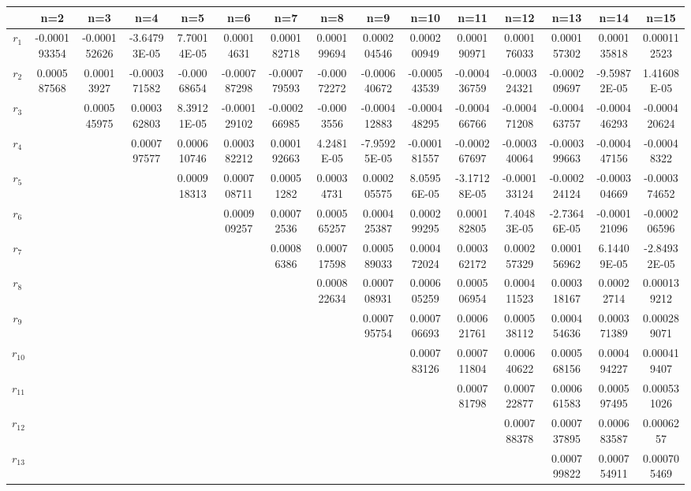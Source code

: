 \documentclass[a4paper]{article}
\begin{document}
\begin{CJK*}{GBK}{song}
\begin{center}
\begin{table*}[!htbp]
{\begin{threeparttable}[!htbp]
\begin{tabular}{ccccc ccccc ccccc}
 &n=2&n=3 &n=4 &n=5 &n=6 &n=7 &n=8 &n=9 &n=10 &n=11 &n=12 &n=13 &n=14 &n=15 \\ \hline
$r_{1}$	&	-0.000193354	&	-0.000152626	&	-3.64793E-05	&	7.70014E-05	&	0.00014631	&	0.000182718	&	0.000199694	&	0.000204546	&	0.000200949	&	0.000190971	&	0.000176033	&	0.000157302	&	0.000135818	&	0.000112523	\\
$r_{2}$	&	0.000587568	&	0.00013927	&	-0.000371582	&	-0.00068654	&	-0.000787298	&	-0.000779593	&	-0.00072272	&	-0.000640672	&	-0.000543539	&	-0.000436759	&	-0.000324321	&	-0.000209697	&	-9.59872E-05	&	1.41608E-05	\\
$r_{3}$	&		&	0.000545975	&	0.000362803	&	8.39121E-05	&	-0.000129102	&	-0.000266985	&	-0.0003556	&	-0.000412883	&	-0.000448295	&	-0.000466766	&	-0.000471208	&	-0.000463757	&	-0.000446293	&	-0.000420624	\\
$r_{4}$	&		&		&	0.000797577	&	0.000610746	&	0.000382212	&	0.000192663	&	4.2481E-05	&	-7.95925E-05	&	-0.000181557	&	-0.000267697	&	-0.000340064	&	-0.000399663	&	-0.000447156	&	-0.00048322	\\
$r_{5}$	&		&		&		&	0.000918313	&	0.000708711	&	0.00051282	&	0.00034731	&	0.000205575	&	8.05956E-05	&	-3.17128E-05	&	-0.000133124	&	-0.000224124	&	-0.000304669	&	-0.000374652	\\
$r_{6}$	&		&		&		&		&	0.000909257	&	0.00072536	&	0.000565257	&	0.000425387	&	0.000299295	&	0.000182805	&	7.40483E-05	&	-2.73646E-05	&	-0.000121096	&	-0.000206596	\\
$r_{7}$	&		&		&		&		&		&	0.00086386	&	0.000717598	&	0.000589033	&	0.000472024	&	0.000362172	&	0.000257329	&	0.000156962	&	6.14409E-05	&	-2.84932E-05	\\
$r_{8}$	&		&		&		&		&		&		&	0.000822634	&	0.000708931	&	0.000605259	&	0.000506954	&	0.000411523	&	0.000318167	&	0.00022714	&	0.000139212	\\
$r_{9}$	&		&		&		&		&		&		&		&	0.000795754	&	0.000706693	&	0.000621761	&	0.000538112	&	0.000454636	&	0.000371389	&	0.000289071	\\
$r_{10}$	&		&		&		&		&		&		&		&		&	0.000783126	&	0.000711804	&	0.000640622	&	0.000568156	&	0.000494227	&	0.000419407	\\
$r_{11}$	&		&		&		&		&		&		&		&		&		&	0.000781798	&	0.000722877	&	0.000661583	&	0.000597495	&	0.000531026	\\
$r_{12}$	&		&		&		&		&		&		&		&		&		&		&	0.000788378	&	0.000737895	&	0.000683587	&	0.0006257	\\
$r_{13}$	&		&		&		&		&		&		&		&		&		&		&		&	0.000799822	&	0.000754911	&	0.000705469	\\

\end{tabular}
\end{threeparttable}}
\end{table*}
\end{center}
\end{CJK*}
\end{document}
